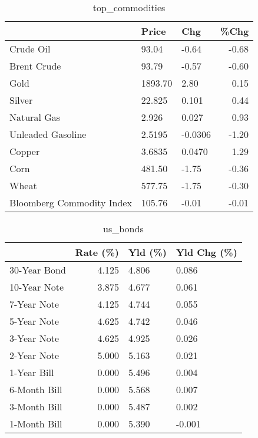 \documentclass{article}%
\begin{document}
\begin{table}[htbp]%
\caption{top\_commodities}%
\centering%
\begin{adjustbox}{width=1\textwidth}%
\begin{tabular}{lllr}
\toprule
                          &   Price &     Chg &  \%Chg \\
\midrule
               Crude Oil  &   93.04 &   -0.64 & -0.68 \\
             Brent Crude  &   93.79 &   -0.57 & -0.60 \\
                    Gold  & 1893.70 &    2.80 &  0.15 \\
                  Silver  &  22.825 &   0.101 &  0.44 \\
             Natural Gas  &   2.926 &   0.027 &  0.93 \\
       Unleaded Gasoline  &  2.5195 & -0.0306 & -1.20 \\
                  Copper  &  3.6835 &  0.0470 &  1.29 \\
                    Corn  &  481.50 &   -1.75 & -0.36 \\
                   Wheat  &  577.75 &   -1.75 & -0.30 \\
Bloomberg Commodity Index &  105.76 &   -0.01 & -0.01 \\
\bottomrule
\end{tabular}
%
\end{adjustbox}%
\end{table}

%


\begin{table}[htbp]%
\caption{us\_bonds}%
\centering%
\begin{adjustbox}{width=1\textwidth}%
\begin{tabular}{lrll}
\toprule
             &  Rate (\%) & Yld (\%) & Yld Chg (\%) \\
\midrule
30-Year Bond &     4.125 &   4.806 &       0.086 \\
10-Year Note &     3.875 &   4.677 &       0.061 \\
 7-Year Note &     4.125 &   4.744 &       0.055 \\
 5-Year Note &     4.625 &   4.742 &       0.046 \\
 3-Year Note &     4.625 &   4.925 &       0.026 \\
 2-Year Note &     5.000 &   5.163 &       0.021 \\
 1-Year Bill &     0.000 &   5.496 &       0.004 \\
6-Month Bill &     0.000 &   5.568 &       0.007 \\
3-Month Bill &     0.000 &   5.487 &       0.002 \\
1-Month Bill &     0.000 &   5.390 &      -0.001 \\
\bottomrule
\end{tabular}
%
\end{adjustbox}%
\end{table}
\end{document}
